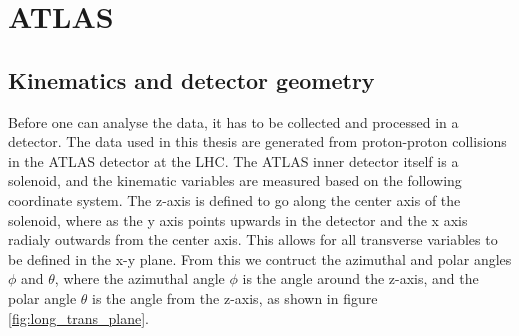 \section{ATLAS}

\subsection*{Kinematics and detector geometry}
Before one can analyse the data, it has to be collected and processed in a detector. The data used in this thesis 
are generated from proton-proton collisions in the ATLAS detector at the LHC. The ATLAS inner detector itself is a solenoid, 
and the kinematic variables are measured based on the following coordinate system. The z-axis is defined to go 
along the center axis of the solenoid, where as the y axis points upwards in the detector and the x axis radialy 
outwards from the center axis. This allows for all transverse variables to be defined in the x-y plane\cite{Gramstad:1631043}. 
From this we contruct the azimuthal and polar angles $\phi$ and $\theta$, where the azimuthal angle $\phi$\cite{Airapetian:391176} is the angle around the z-axis, 
and the polar angle $\theta$ is the angle from the z-axis, as shown in figure \ref{fig:long_trans_plane}.



